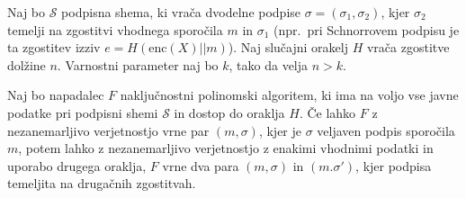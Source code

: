 \begin{izrek}
\label{izr:forking}
    Naj bo $\mathcal{S}$ podpisna shema, ki vrača dvodelne podpise $\sigma = (\sigma_1, \sigma_2)$,
    kjer $\sigma_2$ temelji na zgostitvi vhodnega sporočila $m$ in $\sigma_1$ (npr.\ pri Schnorrovem
    podpisu je ta zgostitev izziv  $e = H(\text{enc}(X) || m)$). Naj slučajni orakelj $H$ vrača zgostitve
    dolžine $n$. Varnostni parameter naj bo $k$, tako da velja $n > k$.

    Naj bo napadalec $F$ naključnostni polinomski algoritem, ki ima na voljo vse javne podatke pri
    podpisni shemi $\mathcal{S}$ in dostop do oraklja $H$. Če lahko $F$ z nezanemarljivo verjetnostjo
    vrne par $(m, \sigma)$, kjer je $\sigma$  veljaven podpis sporočila $m$, potem lahko z nezanemarljivo
    verjetnostjo z enakimi vhodnimi podatki in uporabo drugega oraklja, $F$ vrne dva para
    $(m, \sigma)$ in $(m. \sigma')$, kjer podpisa temeljita na drugačnih zgostitvah.
\end{izrek}

